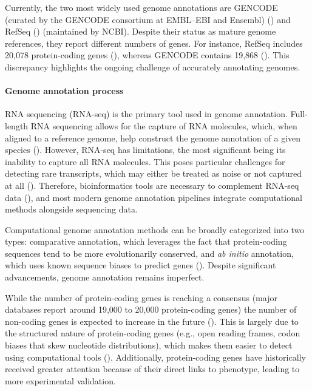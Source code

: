 Currently, the two most widely used genome annotations are
GENCODE (curated by the GENCODE consortium at EMBL–EBI and Ensembl) (\cite{Mudge2024}) and RefSeq (\cite{OLeary2015}) (maintained by NCBI).
Despite their status as mature genome references, they report different numbers of genes.
For instance, RefSeq includes 20,078 protein-coding genes (\cite{ncbi}), whereas GENCODE contains 19,868 (\cite{ensembl}).
This discrepancy highlights the ongoing challenge of accurately annotating genomes.

\paragraph{Genome annotation process}

RNA sequencing (RNA-seq) is the primary tool used in genome annotation.
Full-length RNA sequencing allows for the capture of RNA molecules, which, when aligned to a reference genome,
help construct the genome annotation of a given species (\cite{Salzberg2019}).
However, RNA-seq has limitations, the most significant being its inability to capture all RNA molecules.
This poses particular challenges for detecting rare transcripts, which may either be treated as noise or not captured at all (\cite{Salzberg2019}).
Therefore, bioinformatics tools are necessary to complement RNA-seq data (\cite{Guigo2023}),
and most modern genome annotation pipelines integrate computational methods alongside sequencing data.

Computational genome annotation methods can be broadly categorized into two types:
comparative annotation, which leverages the fact that protein-coding sequences tend to be more evolutionarily conserved,
and \textit{ab initio} annotation, which uses known sequence biases to predict genes (\cite{Guigo2023}).
Despite significant advancements, genome annotation remains imperfect.

While the number of protein-coding genes is reaching a consensus (major databases report around 19,000 to 20,000 protein-coding genes) 
the number of non-coding genes is expected to increase in the future (\cite{Amaral2023}).
This is largely due to the structured nature of protein-coding genes (e.g., open reading frames, codon biases that skew nucleotide distributions),
which makes them easier to detect using computational tools (\cite{Guigo2023}).
Additionally, protein-coding genes have historically received greater attention because of their direct links to phenotype,
leading to more experimental validation.

